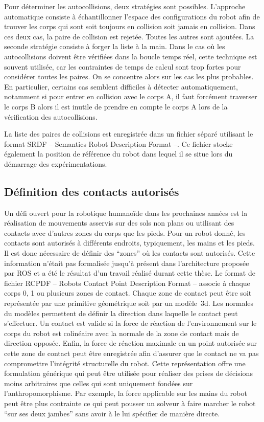 Pour déterminer les autocollisions, deux stratégies sont
possibles. L'approche automatique consiste à échantillonner l'espace
des configurations du robot afin de trouver les corps qui sont soit
toujours en collision soit jamais en collision. Dans ces deux cas, la
paire de collision est rejetée. Toutes les autres sont ajoutées.  La
seconde stratégie consiste à forger la liste à la main. Dans le cas où
les autocollisions doivent être vérifiées dans la boucle temps réel,
cette technique est souvent utilisée, car les contraintes de temps de
calcul sont trop fortes pour considérer toutes les paires. On se
concentre alors sur les cas les plus probables. En particulier,
certains cas semblent difficiles à détecter automatiquement, notamment
si pour entrer en collision avec le corps A, il faut forcément
traverser le corps B alors il est inutile de prendre en compte le
corps A lors de la vérification des autocollisions.

La liste des paires de collisions est enregistrée dans un fichier
séparé utilisant le format SRDF -- Semantics Robot Description Format
--. Ce fichier stocke
également la position de référence du robot dans lequel il se situe
lors du démarrage des expérimentations.


\subsection{Définition des contacts autorisés}

Un défi ouvert pour la robotique humanoïde dans les prochaines années
est la réalisation de mouvements asservis sur des sols non plans ou
utilisant des contacts avec d'autres zones du corps que les
pieds. Pour un robot donné, les contacts sont autorisés à différents
endroits, typiquement, les mains et les pieds. Il est donc nécessaire
de définir des ``zones'' où les contacts sont autorisés. Cette
information n'était pas formalisée jusqu'à présent dans l'architecture
proposée par ROS et a été le résultat d'un travail réalisé durant
cette thèse. Le format de fichier RCPDF -- Robots Contact Point
Description Format -- associe à chaque corps 0, 1 ou plusieurs zones de
contact. Chaque zone de contact peut être soit représentée par une
primitive géométrique soit par un modèle 3d. Les normales du modèles
permettent de définir la direction dans laquelle le contact peut
s'effectuer. Un contact est valide si la force de réaction de
l'environnement sur le corps du robot est colinéaire avec la normale
de la zone de contact mais de direction opposée. Enfin, la force de
réaction maximale en un point autorisée sur cette zone de contact peut
être enregistrée afin d'assurer que le contact ne va pas compromettre
l'intégrité structurelle du robot. Cette représentation offre une
formulation générique qui peut être utilisée pour réaliser des prises
de décisions moins arbitraires que celles qui sont uniquement fondées
sur l'anthropomorphisme. Par exemple, la force applicable sur les
mains du robot peut être plus contrainte ce qui peut pousser un
solveur à faire marcher le robot ``sur ses deux jambes'' sans avoir à
le lui spécifier de manière directe.

